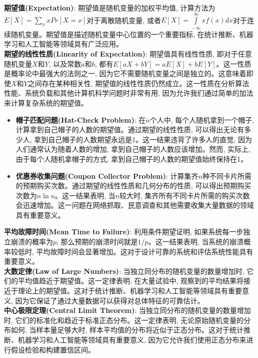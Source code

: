 \documentclass[12pt, a4paper, UTF8]{ctexart}
\newcommand{\term}[1]{\textbf{\textcolor{blue!80!black}{#1}}}
\newcommand{\emphb}[1]{\textbf{#1}}
\begin{document}
\begin{sloppypar}
    \term{期望值(Expectation)}: 期望值是随机变量的加权平均值, 计算方法为$E[X] = \sum\limits_{x} x Pr[X=x]$对于离散随机变量, 或者$E[X] = \int\limits_{-\infty}^{\infty} x f(x) dx$对于连续随机变量。期望值是描述随机变量中心位置的一个重要指标, 在统计推断、机器学习和人工智能等领域具有广泛应用。\\
    \emphb{期望的线性性质(Linearity of Expectation)}: 期望值具有线性性质, 即对于任意随机变量$X$和$Y$, 以及常数$a$和$b$, 都有$E[aX + bY] = aE[X] + bE[Y]$。这一性质是概率论中最强大的法则之一, 因为它不需要随机变量之间是独立的。这意味着即使$X$和$Y$之间存在某种相关性, 期望值的线性性质仍然成立。这一性质在分析算法性能、系统负载和其他计算机科学问题时非常有用, 因为允许我们通过简单的加法来计算复杂系统的期望值。
    \begin{itemize}[nosep]
        \item \emphb{帽子匹配问题(Hat-Check Problem)}: 在$n$个人中, 每个人随机拿到一个帽子, 计算拿到自己帽子的人数的期望值。通过期望的线性性质, 可以得出无论有多少人, 拿到自己帽子的人数期望永远是1。这一结果违背了许多人的直觉, 因为人们通常认为随着人数的增加, 拿到自己帽子的人数应该增加。然而, 实际上, 由于每个人随机拿帽子的方式, 拿到自己帽子的人数的期望值始终保持在1。
        \item \emphb{优惠券收集问题(Coupon Collector Problem)}: 计算集齐$n$种不同卡片所需的预期购买次数。通过期望的线性性质和几何分布的性质, 可以得出预期购买次数为$n \ln n$。这一结果表明, 当$n$较大时, 集齐所有不同卡片所需的购买次数会迅速增加。这一问题在网络抓取、民意调查和其他需要收集大量数据的领域具有重要意义。
    \end{itemize}
    \emphb{平均故障时间(Mean Time to Failure)}: 利用条件期望证明, 如果系统每一步独立崩溃的概率为$p$, 那么预期的崩溃时间就是$1/p$。这一结果表明, 当系统的崩溃概率较低时, 平均故障时间会显著增加。这对于设计可靠的系统和评估系统性能具有重要意义。\\
    \term{大数定律(Law of Large Numbers)}: 当独立同分布的随机变量的数量增加时, 它们的平均值趋近于期望值。这一定律表明, 在大量试验中, 观察到的平均结果将接近于理论上的期望值。这对于统计推断、机器学习和人工智能等领域具有重要意义, 因为它保证了通过大量数据可以获得对总体特征的可靠估计。\\
    \term{中心极限定理(Central Limit Theorem)}: 当独立同分布的随机变量的数量增加时, 它们的标准化和趋近于标准正态分布。这一定律表明, 无论原始随机变量的分布如何, 当样本量足够大时, 样本平均值的分布将近似于正态分布。这对于统计推断、机器学习和人工智能等领域具有重要意义, 因为它允许我们使用正态分布来进行假设检验和构建置信区间。


\end{sloppypar}
\end{document}
